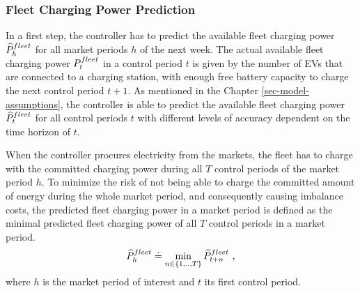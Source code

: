 \documentclass[a4paper, 12pt]{article}
\begin{document}
\subsubsection{Fleet Charging Power Prediction}
\label{sec:org18d8b6a}
In a first step, the controller has to predict the available fleet charging
power \(\widehat{P}^{fleet}_{h}\) for all market periods \(h\) of the next week. The actual
available fleet charging power \(P^{fleet}_{t}\) in a control period \(t\) is given by the
number of EVs that are connected to a charging station, with enough free battery
capacity to charge the next control period \(t\!+\!1\). As mentioned in the
Chapter \ref{sec-model-assumptions}, the controller is able to predict the
available fleet charging power \(\widehat{P}^{fleet}_{t}\) for all control periods \(t\) with
different levels of accuracy dependent on the time horizon of \(t\).

When the controller procures electricity from the markets, the fleet has to
charge with the committed charging power during all \(T\) control periods of the
market period \(h\).
To minimize the risk of not being able to charge the committed amount of energy
during the whole market period, and consequently causing imbalance costs, the
predicted fleet charging power in a market period is defined as the minimal
predicted fleet charging power of all \(T\) control periods in a market period.
\begin{equation}
    \widehat{P}^{fleet}_{h} \doteq \min_{n \in \{1, .., T\}} \widehat{P}^{fleet}_{t + n} \text{ ,}
\end{equation}
where \(h\) is the market period of interest and \(t\) its first control period.
\end{document}
